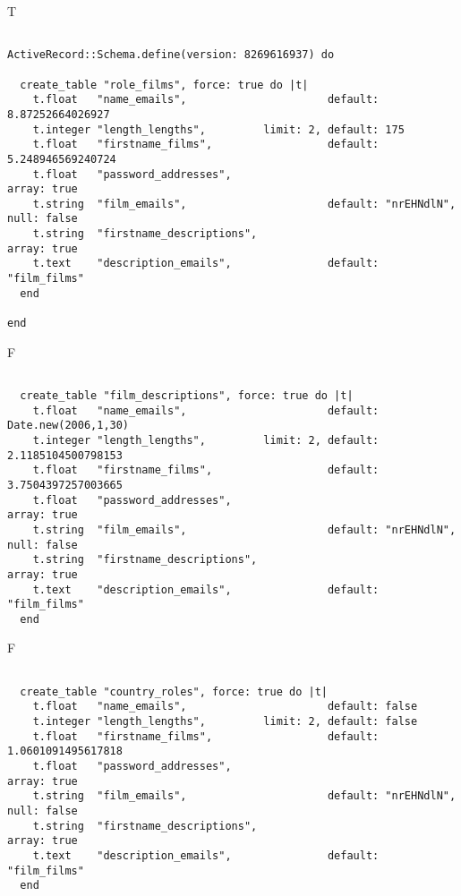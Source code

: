 T
\begin{verbatim}

ActiveRecord::Schema.define(version: 8269616937) do

  create_table "role_films", force: true do |t|
    t.float   "name_emails",                      default: 8.87252664026927
    t.integer "length_lengths",         limit: 2, default: 175
    t.float   "firstname_films",                  default: 5.248946569240724
    t.float   "password_addresses",                                                        array: true
    t.string  "film_emails",                      default: "nrEHNdlN",        null: false
    t.string  "firstname_descriptions",                                                    array: true
    t.text    "description_emails",               default: "film_films"
  end

end
\end{verbatim}


F
\begin{verbatim}

  create_table "film_descriptions", force: true do |t|
    t.float   "name_emails",                      default: Date.new(2006,1,30)
    t.integer "length_lengths",         limit: 2, default: 2.1185104500798153
    t.float   "firstname_films",                  default: 3.7504397257003665
    t.float   "password_addresses",                                                        array: true
    t.string  "film_emails",                      default: "nrEHNdlN",        null: false
    t.string  "firstname_descriptions",                                                    array: true
    t.text    "description_emails",               default: "film_films"
  end

\end{verbatim}

F
\begin{verbatim}

  create_table "country_roles", force: true do |t|
    t.float   "name_emails",                      default: false
    t.integer "length_lengths",         limit: 2, default: false
    t.float   "firstname_films",                  default: 1.0601091495617818
    t.float   "password_addresses",                                                        array: true
    t.string  "film_emails",                      default: "nrEHNdlN",        null: false
    t.string  "firstname_descriptions",                                                    array: true
    t.text    "description_emails",               default: "film_films"
  end

\end{verbatim}

